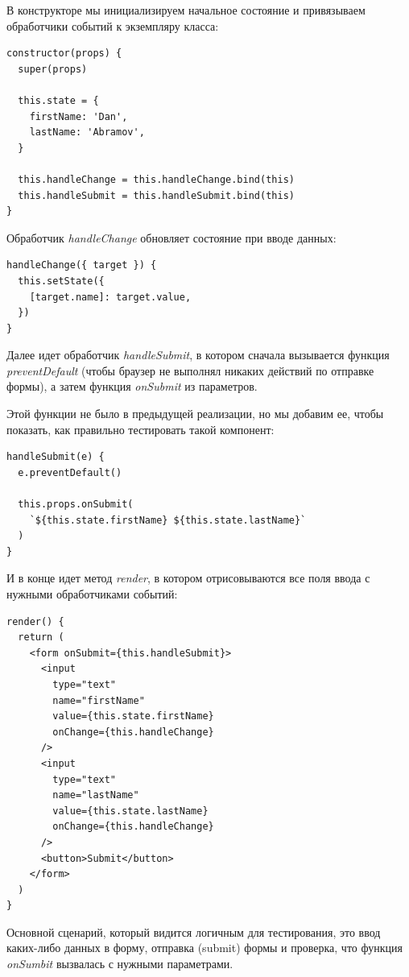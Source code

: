В конструкторе мы инициализируем начальное состояние и привязываем обработчики событий к экземпляру класса:

\begin{lstlisting}
constructor(props) {
  super(props)
  
  this.state = {
    firstName: 'Dan',
    lastName: 'Abramov',
  }
  
  this.handleChange = this.handleChange.bind(this)
  this.handleSubmit = this.handleSubmit.bind(this)
}
\end{lstlisting}

Обработчик \textit{handleChange} обновляет состояние при вводе данных:

\begin{lstlisting}
handleChange({ target }) {
  this.setState({
    [target.name]: target.value,
  })
}
\end{lstlisting}

Далее идет обработчик \textit{handleSubmit}, в котором сначала вызывается функция \textit{preventDefault} (чтобы браузер не выполнял никаких действий по отправке формы), а затем функция \textit{onSubmit} из параметров.

Этой функции не было в предыдущей реализации, но мы добавим ее, чтобы показать, как правильно тестировать такой компонент:

\begin{lstlisting}
handleSubmit(e) {
  e.preventDefault()
  
  this.props.onSubmit(
    `${this.state.firstName} ${this.state.lastName}`
  )
}
\end{lstlisting}

И в конце идет метод \textit{render}, в котором отрисовываются все поля ввода с нужными обработчиками событий:

\begin{lstlisting}
render() {
  return (
    <form onSubmit={this.handleSubmit}>
      <input
        type="text"
        name="firstName"
        value={this.state.firstName}
        onChange={this.handleChange}
      />
      <input
        type="text"
        name="lastName"
        value={this.state.lastName}
        onChange={this.handleChange}
      />
      <button>Submit</button>
    </form>
  )
}
\end{lstlisting}

Основной сценарий, который видится логичным для тестирования, это ввод каких-либо данных в форму, отправка (submit) формы и проверка, что функция \textit{onSumbit} вызвалась с нужными параметрами.

